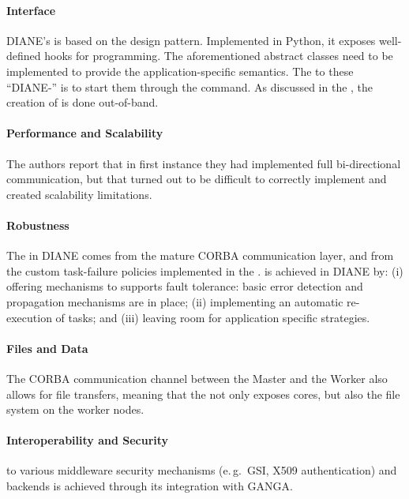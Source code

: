 \documentclass{sig-alternate}
\begin{document}
\paragraph{Interface}
DIANE's  is based on the 
design pattern. Implemented in Python, it exposes well-defined hooks for
 programming. The aforementioned abstract classes need to be
implemented to provide the application-specific semantics. The 
to these ``DIANE-'' is to start them through the
 command.
As discussed in the , the creation of \pilots is done
out-of-band.

\paragraph{Performance and Scalability}
The authors report that in first instance they had implemented full
bi-directional communication, but that turned out to be difficult to correctly
implement and created scalability limitations.

\paragraph{Robustness}
The  in DIANE comes from the mature CORBA communication layer,
and from the custom task-failure policies implemented in the
.  is achieved in DIANE by: (i)
offering mechanisms to supports fault tolerance: basic error detection and
propagation mechanisms are in place; (ii) implementing an automatic
re-execution of tasks; and (iii) leaving room for application specific
strategies.

\paragraph{Files and Data}
The CORBA communication channel between the Master and the Worker also allows
for file transfers, meaning that the \pilot not only exposes cores, but also
the file system on the worker nodes.

\paragraph{Interoperability and Security}
 to various middleware security mechanisms
(e.\,g.\ GSI, X509 authentication) and backends is achieved through its
integration with GANGA.
\end{document}
